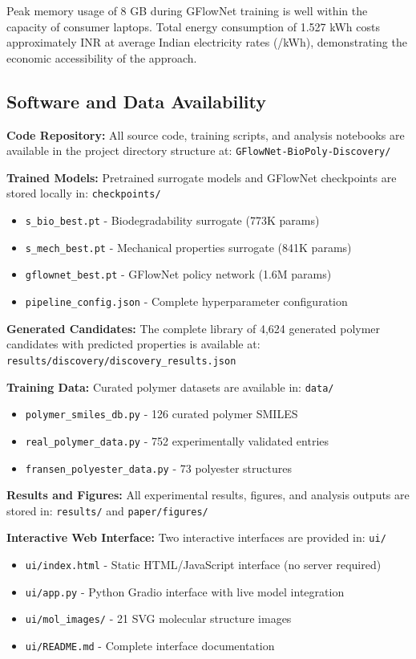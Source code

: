 \documentclass[twocolumn,10pt]{article}
\begin{document}
Peak memory usage of 8 GB during GFlowNet training is well within the capacity of consumer laptops. Total energy consumption of 1.527 kWh costs approximately  INR at average Indian electricity rates (/kWh), demonstrating the economic accessibility of the approach.

\subsection{Software and Data Availability}

\textbf{Code Repository:} All source code, training scripts, and analysis notebooks are available in the project directory structure at: \texttt{GFlowNet-BioPoly-Discovery/}

\textbf{Trained Models:} Pretrained surrogate models and GFlowNet checkpoints are stored locally in: \texttt{checkpoints/}
\begin{itemize}[noitemsep,leftmargin=*]
\item \texttt{s\_bio\_best.pt} - Biodegradability surrogate (773K params)
\item \texttt{s\_mech\_best.pt} - Mechanical properties surrogate (841K params)
\item \texttt{gflownet\_best.pt} - GFlowNet policy network (1.6M params)
\item \texttt{pipeline\_config.json} - Complete hyperparameter configuration
\end{itemize}

\textbf{Generated Candidates:} The complete library of 4,624 generated polymer candidates with predicted properties is available at: \texttt{results/discovery/discovery\_results.json}

\textbf{Training Data:} Curated polymer datasets are available in: \texttt{data/}
\begin{itemize}[noitemsep,leftmargin=*]
\item \texttt{polymer\_smiles\_db.py} - 126 curated polymer SMILES
\item \texttt{real\_polymer\_data.py} - 752 experimentally validated entries
\item \texttt{fransen\_polyester\_data.py} - 73 polyester structures
\end{itemize}

\textbf{Results and Figures:} All experimental results, figures, and analysis outputs are stored in: \texttt{results/} and \texttt{paper/figures/}

\textbf{Interactive Web Interface:} Two interactive interfaces are provided in: \texttt{ui/}
\begin{itemize}[noitemsep,leftmargin=*]
\item \texttt{ui/index.html} - Static HTML/JavaScript interface (no server required)
\item \texttt{ui/app.py} - Python Gradio interface with live model integration
\item \texttt{ui/mol\_images/} - 21 SVG molecular structure images
\item \texttt{ui/README.md} - Complete interface documentation
\end{itemize}
\end{document}
